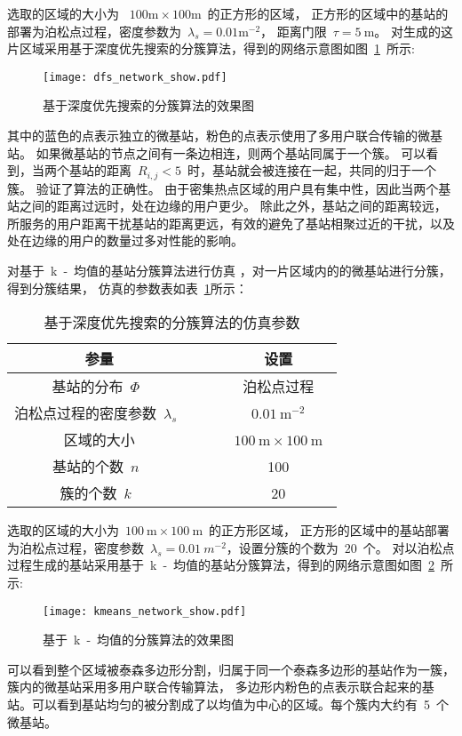 选取的区域的大小为 ~$100\mathrm{m} \times 100 \mathrm{m}$~的正方形的区域，
正方形的区域中的基站的部署为泊松点过程，密度参数为~$\lambda_s=0.01 \mathrm{m}^{-2}$，
距离门限~$\tau=5~\mathrm{m}$。
对生成的这片区域采用基于深度优先搜索的分簇算法，得到的网络示意图如图~\ref{dfs_network_show}~所示:
\begin{figure}[htbp]
\centering
\texttt{[image: dfs\_network\_show.pdf]}
\caption{基于深度优先搜索的分簇算法的效果图}\vspace{-0.5em}
\label{dfs_network_show}
\end{figure}
其中的蓝色的点表示独立的微基站，粉色的点表示使用了多用户联合传输的微基站。
如果微基站的节点之间有一条边相连，则两个基站同属于一个簇。
可以看到，当两个基站的距离~$R_{i,j} < 5$~时，基站就会被连接在一起，共同的归于一个簇。
验证了算法的正确性。
由于密集热点区域的用户具有集中性，因此当两个基站之间的距离过远时，处在边缘的用户更少。
除此之外，基站之间的距离较远，所服务的用户距离干扰基站的距离更远，有效的避免了基站相聚过近的干扰，以及处在边缘的用户的数量过多对性能的影响。

对基于~k~-~均值的基站分簇算法进行仿真
，对一片区域内的的微基站进行分簇，得到分簇结果，
仿真的参数表如表~\ref{kmeans_show_sim_para}所示：
\begin{table}[htbp]
\caption{基于深度优先搜索的分簇算法的仿真参数}
\label{kmeans_show_sim_para}
\vspace{0.5em}\centering\wuhao
\begin{tabular}{cccc}
\toprule[1.5pt]
参量 & & & 设置 \\
\midrule[0.5pt]
基站的分布~$\Phi$~ & & & 泊松点过程 \\
泊松点过程的密度参数~$\lambda_s$~ & & & ~$0.01~\mathrm{m}^{-2}$~ \\
区域的大小  & & & ~$100~\mathrm{m} \times 100~ \mathrm{m}$~ \\
基站的个数~$n$~  & & & 100\\
簇的个数~$k$~ & & & ~$20$~\\
\bottomrule[1.5pt]
\end{tabular}
\end{table}

选取的区域的大小为~$100~\mathrm{m} \times 100~ \mathrm{m}$~的正方形区域，
正方形的区域中的基站部署为泊松点过程，密度参数~$\lambda_s=0.01~m^{-2}$，设置分簇的个数为~$20$~个。
对以泊松点过程生成的基站采用基于~k~-~均值的基站分簇算法，得到的网络示意图如图~\ref{kmeans_network_show}~所示:
\begin{figure}[htbp]
\centering
\texttt{[image: kmeans\_network\_show.pdf]}
\caption{基于~k~-~均值的分簇算法的效果图}\vspace{-0.5em}
\label{kmeans_network_show}
\end{figure}
可以看到整个区域被泰森多边形分割，归属于同一个泰森多边形的基站作为一簇，簇内的微基站采用多用户联合传输算法，
多边形内粉色的点表示联合起来的基站。可以看到基站均匀的被分割成了以均值为中心的区域。每个簇内大约有~5~个微基站。
